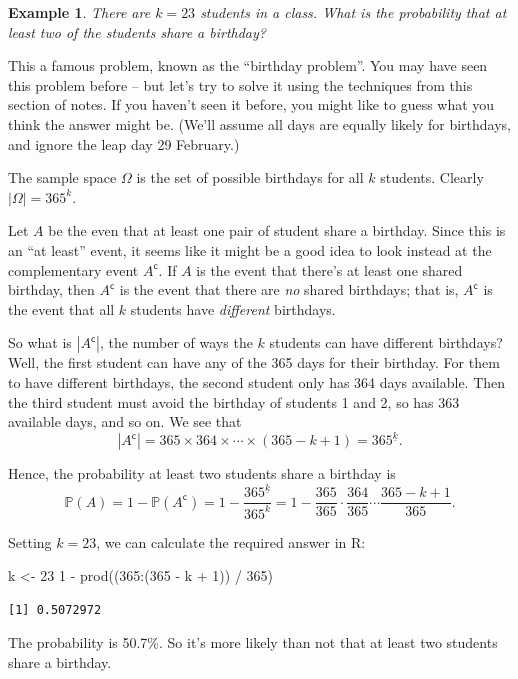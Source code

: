 \documentclass[
  a4paper,
]{book}
\newenvironment{Shaded}{\begin{snugshade}}{\end{snugshade}}
\newcommand{\DecValTok}[1]{\textcolor[rgb]{0.00,0.00,0.81}{#1}}
\newcommand{\FunctionTok}[1]{\textcolor[rgb]{0.00,0.00,0.00}{#1}}
\newcommand{\NormalTok}[1]{#1}
\newcommand{\OtherTok}[1]{\textcolor[rgb]{0.56,0.35,0.01}{#1}}
\newcommand{\SpecialCharTok}[1]{\textcolor[rgb]{0.00,0.00,0.00}{#1}}
\theoremstyle{definition}
\theoremstyle{definition}
\newtheorem{example}{Example}[chapter]
\theoremstyle{definition}
\theoremstyle{definition}
\theoremstyle{remark}
\begin{document}
\begin{example}
\emph{There are \(k = 23\) students in a class. What is the probability that at least two of the students share a birthday?}

This a famous problem, known as the ``birthday problem''. You may have seen this problem before -- but let's try to solve it using the techniques from this section of notes. If you haven't seen it before, you might like to guess what you think the answer might be. (We'll assume all days are equally likely for birthdays, and ignore the leap day 29 February.)

The sample space \(\Omega\) is the set of possible birthdays for all \(k\) students. Clearly \(|\Omega| = 365^k\).

Let \(A\) be the even that at least one pair of student share a birthday. Since this is an ``at least'' event, it seems like it might be a good idea to look instead at the complementary event \(A^\mathsf{c}\). If \(A\) is the event that there's at least one shared birthday, then \(A^\mathsf{c}\) is the event that there are \emph{no} shared birthdays; that is, \(A^\mathsf{c}\) is the event that all \(k\) students have \emph{different} birthdays.

So what is \(|A^\mathsf{c}|\), the number of ways the \(k\) students can have different birthdays? Well, the first student can have any of the 365 days for their birthday. For them to have different birthdays, the second student only has 364 days available. Then the third student must avoid the birthday of students 1 and 2, so has 363 available days, and so on. We see that
\[ |A^\mathsf{c}| = 365 \times 364 \times \cdots \times (365 - k + 1) = 365^{\underline{k}} . \]

Hence, the probability at least two students share a birthday is
\[ \mathbb P(A) = 1 - \mathbb P(A^\mathsf{c}) = 1 - \frac{365^{\underline{k}}}{365^k} = 1 - \frac{365}{365} \cdot \frac{364}{365} \cdots \frac{365-k+1}{365} . \]

Setting \(k = 23\), we can calculate the required answer in R:

\begin{Shaded}
\begin{Highlighting}[]
\NormalTok{k }\OtherTok{\textless{}{-}} \DecValTok{23}
\DecValTok{1} \SpecialCharTok{{-}} \FunctionTok{prod}\NormalTok{((}\DecValTok{365}\SpecialCharTok{:}\NormalTok{(}\DecValTok{365} \SpecialCharTok{{-}}\NormalTok{ k }\SpecialCharTok{+} \DecValTok{1}\NormalTok{)) }\SpecialCharTok{/} \DecValTok{365}\NormalTok{)}
\end{Highlighting}
\end{Shaded}

\begin{verbatim}
[1] 0.5072972
\end{verbatim}

The probability is 50.7\%. So it's more likely than not that at least two students share a birthday.
\end{example}
\end{document}
